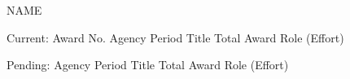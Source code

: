 NAME

Current:
Award No.   Agency      Period      Title                                                                       Total Award     Role (Effort)


Pending:
Agency      Period      Title                                                                       Total Award     Role (Effort)
